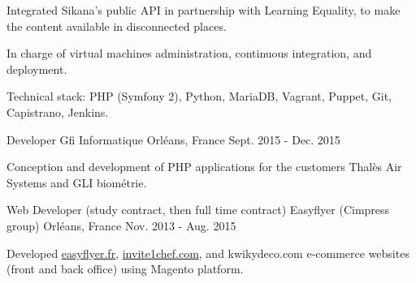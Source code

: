 \begin{cventries}
{\begin{cvitems}
        \item {Integrated Sikana's public API in partnership with Learning Equality, to make the content available in disconnected places.}
        \item {In charge of virtual machines administration, continuous integration, and deployment.}
        \item {Technical stack: PHP (Symfony 2), Python, MariaDB, Vagrant, Puppet, Git, Capistrano, Jenkins.}
      \end{cvitems}
    }
  \cventry
    {Developer}
    {Gfi Informatique}
    {Orléans, France}
    {Sept. 2015 - Dec. 2015}
    {
      \begin{cvitems}
        \item {Conception and development of PHP applications for the customers Thalès Air Systems and GLI biométrie.}
      \end{cvitems}
    }
  \cventry
    {Web Developer (study contract, then full time contract)}
    {Easyflyer (Cimpress group)}
    {Orléans, France}
    {Nov. 2013 - Aug. 2015}
    {
      \begin{cvitems}
        \item {Developed \href{https://www.easyflyer.fr}{easyflyer.fr}, \href{https://www.invite1chef.com}{invite1chef.com}, and kwikydeco.com e-commerce websites (front and back office) using Magento platform.}
      \end{cvitems}
    }
\end{cventries}
